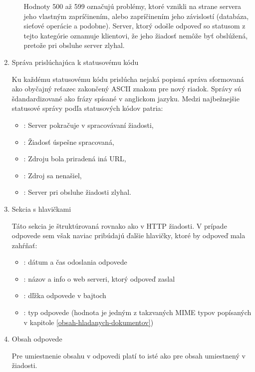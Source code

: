 \begin{enumerate}
\begin{enumerate}
        Hodnoty 500 až 599 označujú problémy, ktoré vznikli na strane servera jeho vlastným zapríčinením, alebo zapríčinením jeho závislostí (databáza, sieťové operácie a podobne).
        Server, ktorý odošle odpoveď so statusom z tejto kategórie oznamuje klientovi, že jeho žiadosť nemôže byť obslúžená, pretože pri obsluhe server zlyhal.
    \end{enumerate}

    \item Správa prislúchajúca k statusovému kódu

    Ku každému statusovému kódu prislúcha nejaká popisná správa sformovaná ako obyčajný reťazec zakončený ASCII znakom pre nový riadok. Správy sú šdandardizované ako frázy spísané v anglickom jazyku.
    Medzi najbežnejšie statusové správy podľa statusových kódov patria:

    \begin{itemize}
        \item {}: Server pokračuje v spracovávaní žiadosti,
        \item {}: Žiadosť úspešne spracovaná,
        \item {}: Zdroju bola priradená iná URL,
        \item {}: Zdroj sa nenašiel,
        \item {}: Server pri obsluhe žiadosti zlyhal.
    \end{itemize}

    \item Sekcia s hlavičkami

    Táto sekcia je štruktúrovaná rovnako ako v HTTP žiadosti. V prípade odpovede sem však naviac pribúdajú ďalšie hlavičky, ktoré by odpoveď mala zahŕňať: 

        \begin{itemize}
            \item {}: dátum a čas odoslania odpovede
            \item {}: názov a info o web serveri, ktorý odpoveď zaslal
            \item {}: dľžka odpovede v bajtoch
            \item {}: typ odpovede (hodnota je jedným z takzvaných MIME typov popísaných v kapitole \ref{obsah-hladanych-dokumentov})
        \end{itemize}

    \item Obsah odpovede

    Pre umiestnenie obsahu v odpovedi platí to isté ako pre obsah umiestnený v žiadosti.
\end{enumerate}


